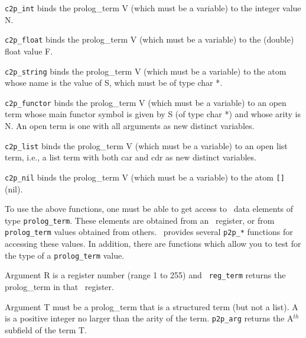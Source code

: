 {\begin{description}
 
    {\tt c2p\_int} binds the prolog\_term V (which must be a variable)
    to the integer value N.

 
    {\tt c2p\_float} binds the prolog\_term V (which must be a variable)
    to the (double) float value F.

 
    {\tt c2p\_string} binds the prolog\_term V (which must be a
    variable) to the atom whose name is the value of S, which must be
    of type char *.

 
    {\tt c2p\_functor} binds the prolog\_term V (which must be a
    variable) to an open term whose main functor symbol is given by S
    (of type char *) and whose arity is N.  An open term is one with
    all arguments as new distinct variables.

 
    {\tt c2p\_list} binds the prolog\_term V (which must be a variable)
    to an open list term, i.e., a list term with both car and cdr as
    new distinct variables.

 
    {\tt c2p\_nil} binds the prolog\_term V (which must be a
    variable) to the atom \verb|[]| (nil).
\end{description}

To use the above functions, one must be able to get access to \ourprolog\
data elements of type {\tt prolog\_term}.  These elements are obtained
from an \ourprolog\ register, or from {\tt prolog\_term} values
obtained from others.  \ourprolog\ provides several {\tt p2p\_*}
functions for accessing these values.  In addition, there are functions
which allow you to test for the type of a {\tt prolog\_term} value.

\begin{description}
 
    Argument R is a register number (range 1 to 255) and {\tt
    reg\_term} returns the prolog\_term in that \ourprolog\ register.

 
    Argument T must be a prolog\_term that is a structured term (but
    not a list).  A is a positive integer no larger than the arity of
    the term.  {\tt p2p\_arg} returns the A$^{th}$ subfield of the term
    T.


\end{description}}
